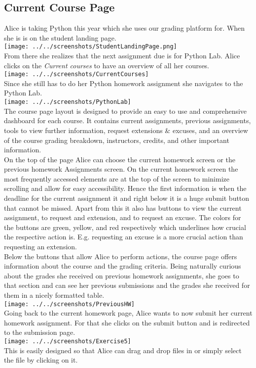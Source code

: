 \subsection{Current Course Page}

Alice is taking Python this year which she uses our grading platform for. When she is is on the student landing page.\\
\texttt{[image: ../../screenshots/StudentLandingPage.png]}\\
From there she realizes that the next assignment due is for Python Lab. Alice clicks on the \textit{Current courses} to have an overview of all her courses.\\
\texttt{[image: ../../screenshots/CurrentCourses]}\\
Since she still has to do her Python homework assignment she navigates to the Python Lab.\\
\texttt{[image: ../../screenshots/PythonLab]}\\
The course page layout is designed to provide an easy to use and comprehensive dashboard for each course. It contains current assignments, previous assignments, tools to view further information, request extensions \& excuses, and an overview of the course grading breakdown, instructors, credits, and other important information.\\

On the top of the page Alice can choose the current homework screen or the previous homework Assignments screen. On the current homework screen the most frequently accessed elements are at the top of the screen to minimize scrolling and allow for easy accessibility. Hence the first information is when the deadline for the current assignment it and right below it is a huge submit button that cannot be missed. Apart from this it also has buttons to view the current assignment, to request and extension, and to request an excuse. The colors for the buttons are green, yellow, and red respectively which underlines how crucial the respective action is. E.g. requesting an excuse is a more crucial action than requesting an extension.\\

Below the buttons that allow Alice to perform actions, the course page offers information about the course and the grading criteria. Being naturally curious about the grades she received on previous homework assignments, she goes to that section and can see her previous submissions and the grades she received for them in a nicely formatted table.\\
\texttt{[image: ../../screenshots/PreviousHW]}\\
Going back to the current homework page, Alice wants to now submit her current homework assignment. For that she clicks on the submit button and is redirected to the submission page.\\
\texttt{[image: ../../screenshots/Exercise5]}\\
This is easily designed so that Alice can drag and drop files in or simply select the file by clicking on it.\\

